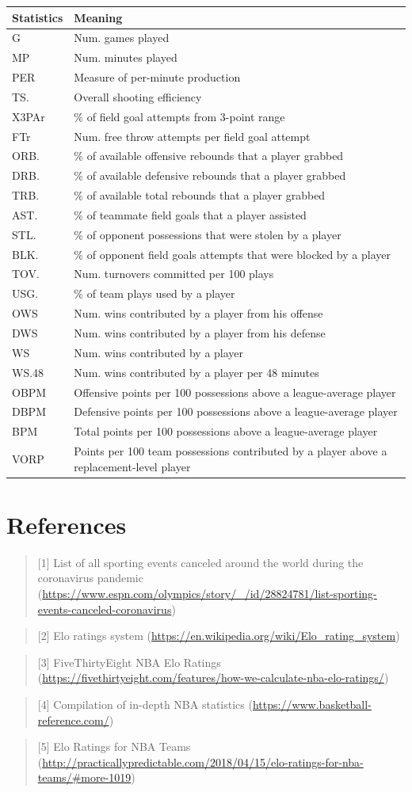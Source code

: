 \documentclass[]{article}
\begin{document}
\begin{longtable}[]{@{}ll@{}}
\toprule
Statistics & Meaning\tabularnewline
\midrule
\endhead
G & Num. games played\tabularnewline
MP & Num. minutes played\tabularnewline
PER & Measure of per-minute production\tabularnewline
TS. & Overall shooting efficiency\tabularnewline
X3PAr & \% of field goal attempts from 3-point range\tabularnewline
FTr & Num. free throw attempts per field goal attempt\tabularnewline
ORB. & \% of available offensive rebounds that a player
grabbed\tabularnewline
DRB. & \% of available defensive rebounds that a player
grabbed\tabularnewline
TRB. & \% of available total rebounds that a player
grabbed\tabularnewline
AST. & \% of teammate field goals that a player assisted\tabularnewline
STL. & \% of opponent possessions that were stolen by a
player\tabularnewline
BLK. & \% of opponent field goals attempts that were blocked by a
player\tabularnewline
TOV. & Num. turnovers committed per 100 plays\tabularnewline
USG. & \% of team plays used by a player\tabularnewline
OWS & Num. wins contributed by a player from his offense\tabularnewline
DWS & Num. wins contributed by a player from his defense\tabularnewline
WS & Num. wins contributed by a player\tabularnewline
WS.48 & Num. wins contributed by a player per 48 minutes\tabularnewline
OBPM & Offensive points per 100 possessions above a league-average
player\tabularnewline
DBPM & Defensive points per 100 possessions above a league-average
player\tabularnewline
BPM & Total points per 100 possessions above a league-average
player\tabularnewline
VORP & Points per 100 team possessions contributed by a player above a
replacement-level player\tabularnewline
\bottomrule
\end{longtable}

\hypertarget{references}{%
\section{References}\label{references}}

\begin{quote}
{[}1{]} List of all sporting events canceled around the world during the
coronavirus pandemic
(\url{https://www.espn.com/olympics/story/_/id/28824781/list-sporting-events-canceled-coronavirus})
\end{quote}

\begin{quote}
{[}2{]} Elo ratings system
(\url{https://en.wikipedia.org/wiki/Elo_rating_system})
\end{quote}

\begin{quote}
{[}3{]} FiveThirtyEight NBA Elo Ratings
(\url{https://fivethirtyeight.com/features/how-we-calculate-nba-elo-ratings/})
\end{quote}

\begin{quote}
{[}4{]} Compilation of in-depth NBA statistics
(\url{https://www.basketball-reference.com/})
\end{quote}

\begin{quote}
{[}5{]} Elo Ratings for NBA Teams
(\url{http://practicallypredictable.com/2018/04/15/elo-ratings-for-nba-teams/\#more-1019})
\end{quote}
\end{document}
